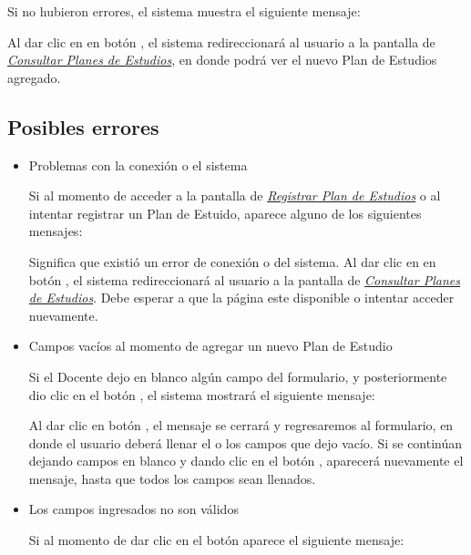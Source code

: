 Si no hubieron errores, el sistema muestra el siguiente mensaje:

Al dar clic en en botón , el sistema redireccionará al usuario a la pantalla de \hyperlink{consultarPE}{\textit{Consultar Planes de Estudios}}, en donde podrá ver el nuevo Plan de Estudios agregado.\\

\subsection{Posibles errores}
\begin{itemize}
	
	\item Problemas con la conexión o el sistema
	
	Si al momento de acceder a la pantalla de \hyperlink{registrarPE}{\textit{Registrar Plan de Estudios}} o al intentar registrar un Plan de Estuido, aparece alguno de los siguientes mensajes:
	
	Significa que existió un error de conexión o del sistema. Al dar clic en en botón , el sistema redireccionará al usuario a la pantalla de \hyperlink{consultarPE}{\textit{Consultar Planes de Estudios}}. Debe esperar a que la página este disponible o intentar acceder nuevamente.
	
	\item Campos vacíos al momento de agregar un nuevo Plan de Estudio
	
	Si el Docente dejo en blanco algún campo del formulario, y posteriormente dio clic en el botón , el sistema mostrará el siguiente mensaje:
	
	Al dar clic en botón , el mensaje se cerrará y regresaremos al formulario, en donde el usuario deberá llenar el o los campos que dejo vacío. Si se continúan dejando campos en blanco y dando clic en el botón , aparecerá nuevamente el mensaje, hasta que todos los campos sean llenados.\\
	

	
	\item Los campos ingresados no son válidos
	
	Si al momento de dar clic en el botón  aparece el siguiente mensaje:

	
\end{itemize}

